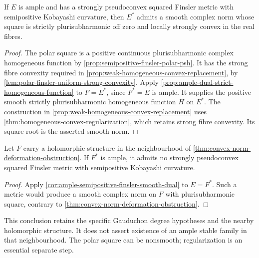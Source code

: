 \begin{corollary}\label{cor:ample-semipositive-finsler-smooth-dual}
If $E$ is ample and has a strongly pseudoconvex squared Finsler metric with semipositive Kobayashi curvature, then $E^*$ admits a smooth complex norm whose square is strictly plurisubharmonic off zero and locally strongly convex in the real fibres.
\end{corollary}
\begin{proof}
The polar square is a positive continuous plurisubharmonic complex homogeneous function by \cref{prop:semipositive-finsler-polar-psh}. It has the strong fibre convexity required in \cref{prop:weak-homogeneous-convex-replacement}, by \cref{lem:polar-finsler-uniform-strong-convexity}. Apply \cref{prop:ample-dual-strict-homogeneous-function} to $F=E^*$, since $F^*=E$ is ample. It supplies the positive smooth strictly plurisubharmonic homogeneous function $H$ on $E^*$. The construction in \cref{prop:weak-homogeneous-convex-replacement} uses \cref{thm:homogeneous-convex-regularization}, which retains strong fibre convexity. Its square root is the asserted smooth norm.
\end{proof}

\begin{corollary}\label{cor:gauduchon-semipositive-finsler-obstruction}
Let $F$ carry a holomorphic structure in the neighbourhood of \cref{thm:convex-norm-deformation-obstruction}. If $F^*$ is ample, it admits no strongly pseudoconvex squared Finsler metric with semipositive Kobayashi curvature.
\end{corollary}
\begin{proof}
Apply \cref{cor:ample-semipositive-finsler-smooth-dual} to $E=F^*$. Such a metric would produce a smooth complex norm on $F$ with plurisubharmonic square, contrary to \cref{thm:convex-norm-deformation-obstruction}.
\end{proof}

This conclusion retains the specific Gauduchon degree hypotheses and the nearby holomorphic structure. It does not assert existence of an ample stable family in that neighbourhood. The polar square can be nonsmooth; regularization is an essential separate step.
